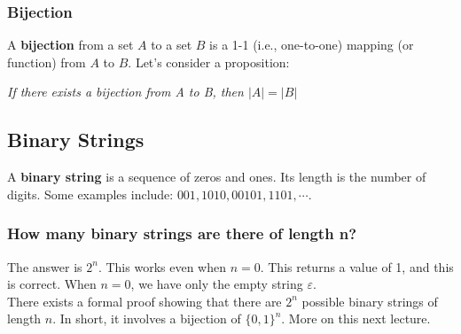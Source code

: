 \documentclass{report}
\begin{document}
\subsubsection{Bijection}
A \textbf{bijection} from a set $A$ to a set $B$ is a 1-1 (i.e., one-to-one) mapping (or function) from $A$ to $B$. Let's consider a proposition:
\begin{center}
\textit{If there exists a bijection from A to B, then $|A| = |B|$}
\end{center}
\subsection{Binary Strings}
A \textbf{binary string} is a sequence of zeros and ones. Its length is the number of digits. Some examples include: $001, 1010, 00101, 1101, \cdots$.
\subsubsection{How many binary strings are there of length n?}
The answer is $2^n$. This works even when $n = 0$. This returns a value of 1, and this is correct. When $n=0$, we have only the empty string $\varepsilon$.\\There exists a formal proof showing that there are $2^n$ possible binary strings of length $n$. In short, it involves a bijection of $\{0,1\}^n$. More on this next lecture.
\end{document}
